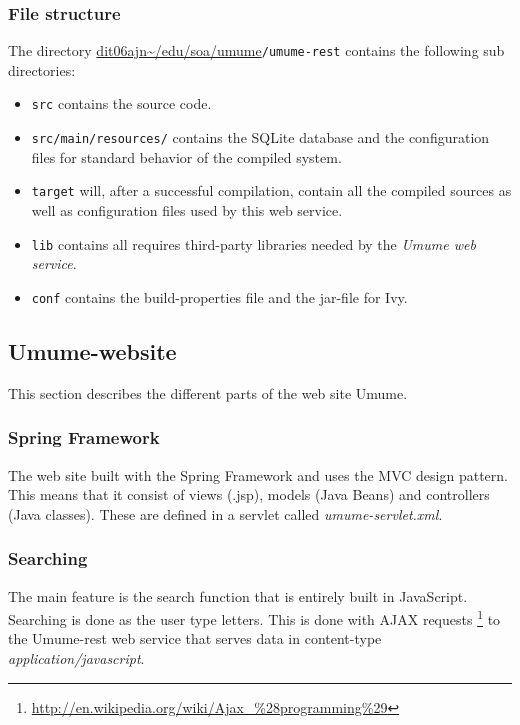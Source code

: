 \documentclass[titlepage, twocolumn, a4paper, 10pt]{article}
\def\pathtocode{\url{dit06ajn~/edu/soa/umume}}
\begin{document}
\subsubsection{File structure}\label{sec:filestructurerest}
The directory \pathtocode\texttt{/umume-rest} contains the
following sub directories:
\begin{itemize}
\item \verb!src! contains the source code.
\item \verb!src/main/resources/! contains the SQLite database and
  the configuration
  files for standard behavior of the compiled system.
\item \verb!target! will, after a successful compilation,
  contain all the compiled sources as well as configuration files used
  by this web service.
\item \verb!lib! contains all requires third-party libraries
  needed by the \textit{Umume web service}.
\item \verb!conf! contains the build-properties file and the jar-file for Ivy.
\end{itemize}

\subsection{Umume-website}\label{sec:umume-website}

This section describes the different parts of the web site Umume.

\subsubsection{Spring Framework}\label{springframework}
The web site built with the Spring Framework and uses the MVC
design pattern. This means that it consist of views (.jsp), models (Java Beans)
and controllers (Java classes). These are defined in a servlet called
\textit{umume-servlet.xml}.

\subsubsection{Searching}\label{sec:web-search}
The main feature is the search function that is entirely built
in JavaScript. Searching is done as the user type letters. This
is done with AJAX requests
\footnote{\url{http://en.wikipedia.org/wiki/Ajax_\%28programming\%29}}
to the Umume-rest web service that serves data in content-type
\textit{application/javascript}.
\end{document}
